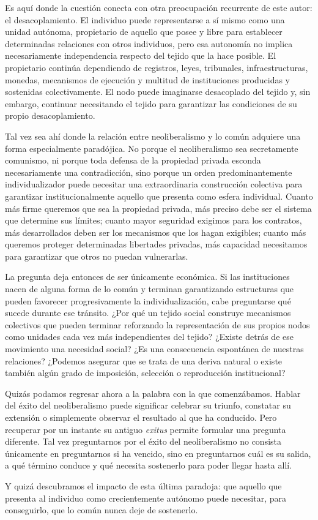 \documentclass[12pt,a4paper]{article}
\begin{document}
Es aquí donde la cuestión conecta con otra preocupación recurrente de este autor: el desacoplamiento. El individuo puede representarse a sí mismo como una unidad autónoma, propietario de aquello que posee y libre para establecer determinadas relaciones con otros individuos, pero esa autonomía no implica necesariamente independencia respecto del tejido que la hace posible. El propietario continúa dependiendo de registros, leyes, tribunales, infraestructuras, monedas, mecanismos de ejecución y multitud de instituciones producidas y sostenidas colectivamente. El nodo puede imaginarse desacoplado del tejido y, sin embargo, continuar necesitando el tejido para garantizar las condiciones de su propio desacoplamiento.

Tal vez sea ahí donde la relación entre neoliberalismo y lo común adquiere una forma especialmente paradójica. No porque el neoliberalismo sea secretamente comunismo, ni porque toda defensa de la propiedad privada esconda necesariamente una contradicción, sino porque un orden predominantemente individualizador puede necesitar una extraordinaria construcción colectiva para garantizar institucionalmente aquello que presenta como esfera individual. Cuanto más firme queremos que sea la propiedad privada, más preciso debe ser el sistema que determine sus límites; cuanto mayor seguridad exigimos para los contratos, más desarrollados deben ser los mecanismos que los hagan exigibles; cuanto más queremos proteger determinadas libertades privadas, más capacidad necesitamos para garantizar que otros no puedan vulnerarlas.

La pregunta deja entonces de ser únicamente económica. Si las instituciones nacen de alguna forma de lo común y terminan garantizando estructuras que pueden favorecer progresivamente la individualización, cabe preguntarse qué sucede durante ese tránsito. ¿Por qué un tejido social construye mecanismos colectivos que pueden terminar reforzando la representación de sus propios nodos como unidades cada vez más independientes del tejido? ¿Existe detrás de ese movimiento una necesidad social? ¿Es una consecuencia espontánea de nuestras relaciones? ¿Podemos asegurar que se trata de una deriva natural o existe también algún grado de imposición, selección o reproducción institucional?

Quizás podamos regresar ahora a la palabra con la que comenzábamos. Hablar del éxito del neoliberalismo puede significar celebrar su triunfo, constatar su extensión o simplemente observar el resultado al que ha conducido. Pero recuperar por un instante su antiguo \textit{exitus} permite formular una pregunta diferente. Tal vez preguntarnos por el éxito del neoliberalismo no consista únicamente en preguntarnos si ha vencido, sino en preguntarnos cuál es su salida, a qué término conduce y qué necesita sostenerlo para poder llegar hasta allí.

Y quizá descubramos el impacto de esta última paradoja: que aquello que presenta al individuo como crecientemente autónomo puede necesitar, para conseguirlo, que lo común nunca deje de sostenerlo.
\end{document}
